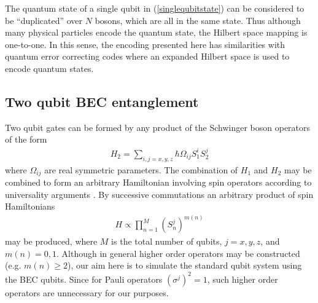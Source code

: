 \documentclass[
aps,%
12pt,%
final,%
notitlepage,%
oneside,%
onecolumn,%
nobibnotes,%
nofootinbib,%
superscriptaddress,%
noshowpacs,%
centertags]%
{revtex4}
\begin{document}
The quantum state of a single qubit in (\ref{singlequbitstate}) can be considered to be ``duplicated'' over $ N $ bosons, which are all in the same state.  Thus although many physical particles encode the quantum state, the Hilbert space mapping is one-to-one.  In this sense, the encoding presented here has similarities with quantum error correcting codes where an expanded Hilbert space is used to encode quantum states.

\subsection{Two qubit BEC entanglement}

Two qubit gates can be formed by any product of the Schwinger boson operators of the form
%
\begin{align}
H_2 = \sum_{i,j = x,y,z} \hbar \Omega_{i j} S^{i}_1 S^{j}_2
\end{align}
%
where $ \Omega_{i j} $ are real symmetric parameters. The combination of $ H_1 $ and $ H_2$ may be combined to form an arbitrary Hamiltonian involving spin operators according to universality arguments \cite{lloyd95}. By successive commutations an arbitrary product of spin Hamiltonians
%
\begin{align}
\label{generaltwoqubit}
H \propto \prod_{n=1}^M (S^j_n)^{m(n)}
\end{align}
%
may be produced, where $ M $ is the total number of qubits, $ j = x,y,z $, and $ m(n) = 0,1 $. Although in general
higher order operators may be constructed (e.g. $ m(n) \ge 2$), our aim here is to simulate the standard qubit system using the BEC qubits. Since for Pauli operators $ (\sigma^j)^2 = 1 $, such higher order operators are unnecessary for our purposes.
\end{document}
